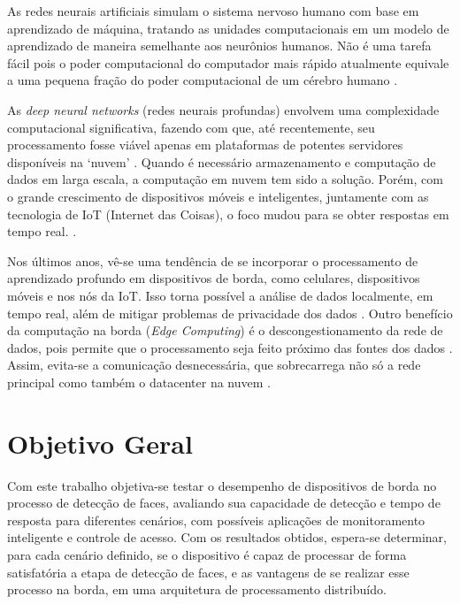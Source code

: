 As redes neurais artificiais simulam o sistema nervoso humano com base em aprendizado de máquina, tratando as unidades computacionais em um modelo de aprendizado de maneira semelhante aos neurônios humanos. Não é uma tarefa fácil pois o poder computacional do computador mais rápido atualmente equivale a uma pequena fração do poder computacional de um cérebro humano \cite{Aggarwal2018}.

As \textit{deep neural networks} (redes neurais profundas) envolvem uma complexidade computacional significativa, fazendo com que, até recentemente, seu processamento fosse viável apenas em plataformas de potentes servidores disponíveis na ‘nuvem’ \cite{Verhelst2017}. Quando é necessário armazenamento e computação de dados em larga escala, a computação em nuvem tem sido a solução. Porém, com o grande crescimento de dispositivos móveis e inteligentes, juntamente com as tecnologia de IoT (Internet das Coisas), o foco mudou para se obter respostas em tempo real. \cite{Dolui2017}.

Nos últimos anos, vê-se uma tendência de se incorporar o processamento de aprendizado profundo em dispositivos de borda, como celulares, dispositivos móveis e nos nós da IoT. Isso torna possível a análise de dados localmente, em tempo real, além de mitigar problemas de privacidade dos dados \cite{Verhelst2017}. Outro benefício da computação na borda (\textit{Edge Computing}) é o descongestionamento da rede de dados, pois permite que o processamento seja feito próximo das fontes dos dados \cite{Merenda2020}. Assim, evita-se a comunicação desnecessária, que sobrecarrega não só a rede principal como também o datacenter na nuvem \cite{Aazam2014}.

\section{Objetivo Geral}

Com este trabalho objetiva-se testar o desempenho de dispositivos de borda no processo de detecção de faces, avaliando sua capacidade de detecção e tempo de resposta para diferentes cenários, com possíveis aplicações de monitoramento inteligente e controle de acesso. Com os resultados obtidos, espera-se determinar, para cada cenário definido, se o dispositivo é capaz de processar de forma satisfatória a etapa de detecção de faces, e as vantagens de se realizar esse processo na borda, em uma arquitetura de processamento distribuído.

